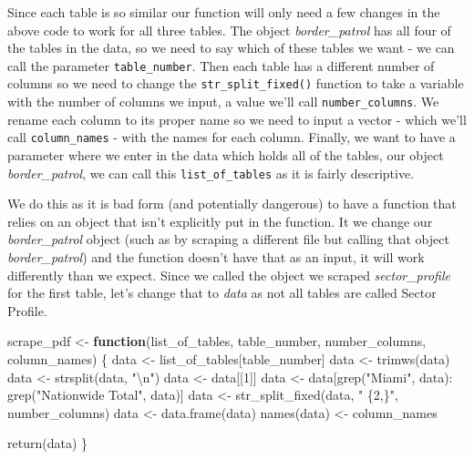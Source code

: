 \documentclass[
]{krantz}
\makeatletter
\newenvironment{Shaded}{\begin{snugshade}}{\end{snugshade}}
\newcommand{\ControlFlowTok}[1]{\textcolor[rgb]{0.27,0.27,0.27}{\textbf{#1}}}
\newcommand{\DecValTok}[1]{\textcolor[rgb]{0.06,0.06,0.06}{#1}}
\newcommand{\FunctionTok}[1]{\textcolor[rgb]{0,0,0}{#1}}
\newcommand{\NormalTok}[1]{#1}
\newcommand{\OtherTok}[1]{\textcolor[rgb]{0.37,0.37,0.37}{#1}}
\newcommand{\SpecialCharTok}[1]{\textcolor[rgb]{0,0,0}{#1}}
\newcommand{\StringTok}[1]{\textcolor[rgb]{0.5,0.5,0.5}{#1}}
\newenvironment{kframe}{%
\medskip{}
\setlength{\fboxsep}{.8em}
 \def\at@end@of@kframe{}%
 \ifinner\ifhmode%
  \def\at@end@of@kframe{\end{minipage}}%
  \begin{minipage}{\columnwidth}%
 \fi\fi%
 \def\FrameCommand##1{\hskip\@totalleftmargin \hskip-\fboxsep
 \colorbox{shadecolor}{##1}\hskip-\fboxsep
     \hskip-\linewidth \hskip-\@totalleftmargin \hskip\columnwidth}%
 \MakeFramed {\advance\hsize-\width
   \@totalleftmargin\z@ \linewidth\hsize
   \@setminipage}}%
 {\par\unskip\endMakeFramed%
 \at@end@of@kframe}
\renewenvironment{Shaded}{\begin{kframe}}{\end{kframe}}
\makeatother
\begin{document}
Since each table is so similar our function will only need a
few changes in the above code to work for all three tables.
The object \emph{border\_patrol} has all four of the tables
in the data, so we need to say which of these tables we want
- we can call the parameter \texttt{table\_number}. Then
each table has a different number of columns so we need to
change the \texttt{str\_split\_fixed()} function to take a
variable with the number of columns we input, a value we'll
call \texttt{number\_columns}. We rename each column to its
proper name so we need to input a vector - which we'll call
\texttt{column\_names} - with the names for each column.
Finally, we want to have a parameter where we enter in the
data which holds all of the tables, our object
\emph{border\_patrol}, we can call this
\texttt{list\_of\_tables} as it is fairly descriptive.

We do this as it is bad form (and potentially dangerous) to
have a function that relies on an object that isn't
explicitly put in the function. It we change our
\emph{border\_patrol} object (such as by scraping a
different file but calling that object
\emph{border\_patrol}) and the function doesn't have that as
an input, it will work differently than we expect. Since we
called the object we scraped \emph{sector\_profile} for the
first table, let's change that to \emph{data} as not all
tables are called Sector Profile.

\begin{Shaded}
\begin{Highlighting}[]
\NormalTok{scrape\_pdf }\OtherTok{\textless{}{-}} \ControlFlowTok{function}\NormalTok{(list\_of\_tables,}
\NormalTok{                       table\_number,}
\NormalTok{                       number\_columns,}
\NormalTok{                       column\_names) \{}
\NormalTok{  data }\OtherTok{\textless{}{-}}\NormalTok{ list\_of\_tables[table\_number]}
\NormalTok{  data }\OtherTok{\textless{}{-}} \FunctionTok{trimws}\NormalTok{(data)}
\NormalTok{  data }\OtherTok{\textless{}{-}} \FunctionTok{strsplit}\NormalTok{(data, }\StringTok{"}\SpecialCharTok{\textbackslash{}n}\StringTok{"}\NormalTok{)}
\NormalTok{  data }\OtherTok{\textless{}{-}}\NormalTok{ data[[}\DecValTok{1}\NormalTok{]]}
\NormalTok{  data }\OtherTok{\textless{}{-}}\NormalTok{ data[}\FunctionTok{grep}\NormalTok{(}\StringTok{"Miami"}\NormalTok{, data)}\SpecialCharTok{:}
  \FunctionTok{grep}\NormalTok{(}\StringTok{"Nationwide Total"}\NormalTok{, data)]}
\NormalTok{  data }\OtherTok{\textless{}{-}} \FunctionTok{str\_split\_fixed}\NormalTok{(data, }\StringTok{" \{2,\}"}\NormalTok{, number\_columns)}
\NormalTok{  data }\OtherTok{\textless{}{-}} \FunctionTok{data.frame}\NormalTok{(data)}
  \FunctionTok{names}\NormalTok{(data) }\OtherTok{\textless{}{-}}\NormalTok{ column\_names}

  \FunctionTok{return}\NormalTok{(data)}
\NormalTok{\}}
\end{Highlighting}
\end{Shaded}
\end{document}
